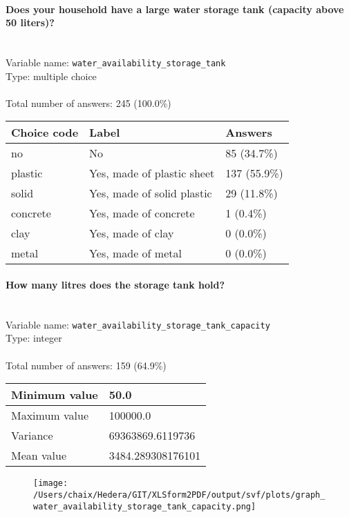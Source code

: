 \documentclass[11.5pt, a4paper]{scrartcl}
\begin{document}
\paragraph{Does your household have a large water storage tank (capacity above 50 liters)? }
\  \\Variable name: \texttt{water\_availability\_storage\_tank}\\
Type: multiple choice\\
\\Total number of answers: 245 (100.0\%)
\\[0.2em] \begin{tabular}{p{4cm}|p{8cm}|p{3cm}}
Choice code & Label & Answers \\
\hline
no & No& \cellcolor{color1}85 (34.7\%)\\
\cellcolor{mygray} plastic & \cellcolor{mygray}Yes, made of plastic sheet & \cellcolor{color2}137 (55.9\%)\\
solid & Yes, made of solid plastic& \cellcolor{color0}29 (11.8\%)\\
\cellcolor{mygray} concrete & \cellcolor{mygray}Yes, made of concrete & \cellcolor{color0}1 (0.4\%)\\
clay & Yes, made of clay& \cellcolor{color0}0 (0.0\%)\\
\cellcolor{mygray} metal & \cellcolor{mygray}Yes, made of metal & \cellcolor{color0}0 (0.0\%)\\
\end{tabular}
\paragraph{How many litres does the storage tank hold? }
\  \\Variable name: \texttt{water\_availability\_storage\_tank\_capacity}\\
Type: integer\\
\\Total number of answers: 159 (64.9\%)
\\[0.2em] \begin{tabular}{p{4cm}|p{8cm}}
Minimum value &50.0 \\
\hline
\cellcolor{mygray} Maximum value & \cellcolor{mygray}100000.0 \\
\hline
Variance &69363869.6119736 \\
\hline
\cellcolor{mygray} Mean value & \cellcolor{mygray}3484.289308176101 \\
\hline
\end{tabular}
\begin{figure}[H]
\centering
\texttt{[image: /Users/chaix/Hedera/GIT/XLSform2PDF/output/svf/plots/graph\_water\_availability\_storage\_tank\_capacity.png]}
\end{figure}
\end{document}
